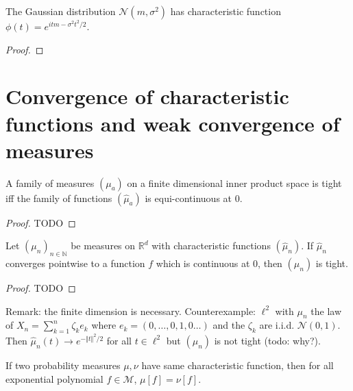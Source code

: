 \begin{lemma}\label{lem:gaussian_charFun}
\leanok
{}
The Gaussian distribution $\mathcal N(m, \sigma^2)$ has characteristic function $\phi(t) = e^{itm - \sigma^2 t^2 /2}$.
\end{lemma}

\begin{proof}\leanok
\end{proof}



\section{Convergence of characteristic functions and weak convergence of measures}

\begin{lemma}\label{lem:tight_iff_charFun_equiContinuous}
A family of measures $(\mu_a)$ on a finite dimensional inner product space is tight iff the family of functions $(\hat{\mu}_a)$ is equi-continuous at 0.
\end{lemma}

\begin{proof}
TODO
\end{proof}


\begin{lemma}\label{lem:tight_of_tendsto_charFun}
Let $(\mu_n)_{n \in \mathbb{N}}$ be measures on $\mathbb{R}^d$ with characteristic functions $(\hat{\mu}_n)$. If $\hat{\mu}_n$ converges pointwise to a function $f$ which is continuous at 0, then $(\mu_n)$ is tight.
\end{lemma}

\begin{proof}
TODO
\end{proof}

Remark: the finite dimension is necessary. Counterexample: $\ell^2$ with $\mu_n$ the law of $X_n = \sum_{k=1}^n \zeta_k e_k$ where $e_k = (0, \ldots, 0, 1, 0 \ldots)$ and the $\zeta_k$ are i.i.d. $\mathcal N(0,1)$. Then $\hat{\mu}_n(t) \to e^{- \Vert t \Vert^2 / 2}$ for all $t \in \ell^2$ but $(\mu_n)$ is not tight (todo: why?).

\begin{lemma}\label{lem:eq_M_of_eq_charFun}
If two probability measures $\mu, \nu$ have same characteristic function, then for all exponential polynomial $f \in \mathcal M$, $\mu[f] = \nu[f]$.
\end{lemma}

